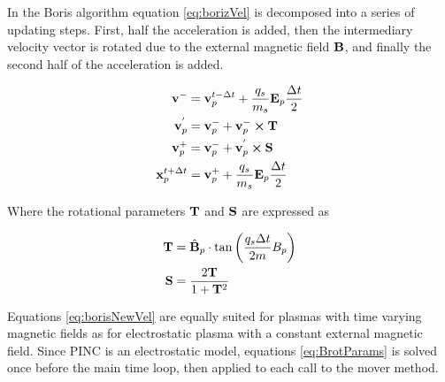 In the Boris algorithm equation \ref{eq:borizVel} is decomposed into a series of updating steps. First, half the acceleration is added, then the intermediary velocity vector is rotated due to the external magnetic field $\vb{B}$, and finally the second half of the acceleration is added.

\begin{subequations}\label{eq:borisNewVel}
    \begin{align}
        \vb{v}^{-} &= \vb{v}^{t-\Delta t}_p + \frac{q_s}{m_s} \vb{E}_p \frac{\Delta t}{2} \\
        \vb{v}^{'}_p &= \vb{v}^{-}_p + \vb{v}^{-}_p \cross \vb{T} \\
        \vb{v}^{+}_p &= \vb{v}^{-}_p + \vb{v}^{'}_p \cross \vb{S} \\
        \vb{x}^{t+\Delta t}_p &= \vb{v}^{+}_p + \frac{q_s}{m_s} \vb{E}_p \frac{\Delta t}{2} 
    \end{align}
\end{subequations}

Where the rotational parameters $\vb{T}$ and $\vb{S}$ are expressed as

\begin{subequations}\label{eq:BrotParams}
    \begin{align}
        \vb{T} &= \hat{\vb{B}}_p \cdot \tan\left(\frac{q_s \Delta t}{2m} B_p \right) \\
        \vb{S} &= \frac{2 \vb{T}}{1 + \vb{T}^2} 
    \end{align}
\end{subequations}

Equations \ref{eq:borisNewVel} are equally suited for plasmas with time varying magnetic fields as for electrostatic plasma with a constant external magnetic field. Since PINC is an electrostatic model, equations \ref{eq:BrotParams} is solved once before the main time loop, then applied to each call to the mover method.

